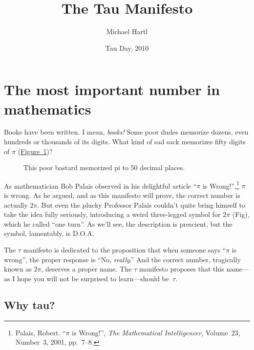 \documentclass{article}
\begin{document}
\title{The Tau Manifesto}
\author{Michael Hartl}
\date{Tau Day, 2010}
\maketitle

\section{The most important number in mathematics} %
\label{sec:the_most_important_number_in_mathematics}

Books have been written. I mean, \emph{books!} Some poor dudes memorize dozens, even hundreds or thousands of its digits. What kind of sad sack memorizes fifty digits of $\pi$ (\hyperref[fig:michael_hartl]{Figure~}\ref{fig:michael_hartl})?

\begin{figure}
\begin{center}
\end{center}
\caption{This poor bastard memorized pi to 50 decimal places.\label{fig:michael_hartl}}
\end{figure}

As mathematician Bob Palais observed in his delightful article ``$\pi$ is Wrong!'',\footnote{Palais, Robert. ``$\pi$ is Wrong!'', \emph{The Mathematical Intelligencer}, Volume~23, Number~3, 2001, pp.~7--8.} $\pi$ is wrong. As he argued, and as this manifesto will prove, the correct number is actually $2\pi$. But even the plucky Professor Palais couldn't quite bring himself to take the idea fully seriously, introducing a weird three-legged symbol for $2\pi$ (Fig), which he called ``one turn''. As we'll see, the description is prescient, but the symbol, lamentably, is D.O.A. 

The $\tau$ manifesto is dedicated to the proposition that when someone says ``$\pi$ is wrong'', the proper response is ``No, \emph{really}.'' And the correct number, tragically known as $2\pi$, deserves a proper name. The $\tau$ manifesto proposes that this name---as I hope you will not be surprised to learn---should be~$\tau$.

  \subsection{Why tau?} %
  \label{sec:why_tau}
  
\end{document}
